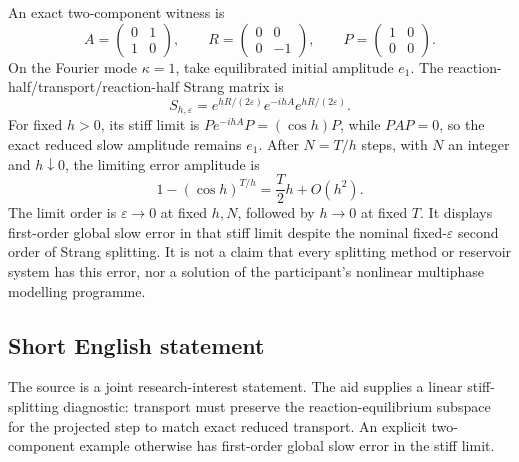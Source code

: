\documentclass[11pt]{article}
\begin{document}
An exact two-component witness is
\[
 A=\begin{pmatrix}0&1\\1&0\end{pmatrix},\qquad
 R=\begin{pmatrix}0&0\\0&-1\end{pmatrix},\qquad
 P=\begin{pmatrix}1&0\\0&0\end{pmatrix}.
\]
On the Fourier mode \(\kappa=1\), take equilibrated initial amplitude \(e_1\). The reaction-half/transport/reaction-half Strang matrix is
\[
 S_{h,\varepsilon}=e^{hR/(2\varepsilon)}e^{-ihA}e^{hR/(2\varepsilon)}.
\]
For fixed \(h>0\), its stiff limit is \(P e^{-ihA}P=(\cos h)P\), while \(PAP=0\), so the exact reduced slow amplitude remains \(e_1\). After \(N=T/h\) steps, with \(N\) an integer and \(h\downarrow0\), the limiting error amplitude is
\[
 1-(\cos h)^{T/h}=\frac T2h+O(h^2).
\]
The limit order is \(\varepsilon\to0\) at fixed \(h,N\), followed by \(h\to0\) at fixed \(T\). It displays first-order global slow error in that stiff limit despite the nominal fixed-\(\varepsilon\) second order of Strang splitting. It is not a claim that every splitting method or reservoir system has this error, nor a solution of the participant's nonlinear multiphase modelling programme.
\subsection{Short English statement}
The source is a joint research-interest statement. The aid supplies a linear stiff-splitting diagnostic: transport must preserve the reaction-equilibrium subspace for the projected step to match exact reduced transport. An explicit two-component example otherwise has first-order global slow error in the stiff limit.
\end{document}
